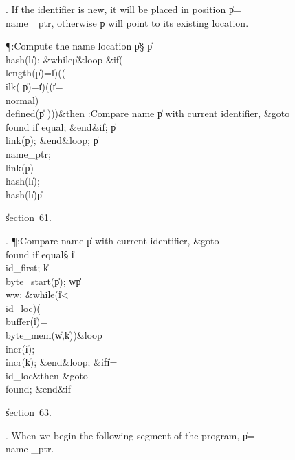 . If the identifier is new, it will be placed in position \|p\?=\?\\{name%
\_ptr},
otherwise \|p will point to its existing location.

\Y\P\?\4:Compute the name location \|p\X\S\?\6
\|p\?\K\?\\{hash}\?\1(\?\|h\?\2)\?;\6
\1\&{while}\8\|p\?\I{}\8\&{loop}\6
\&{if}\1\1\?\8\1(\?\\{length}\?\1(\?\|p\?\2)=\?\|l\?\2)\W\1(\1(\?\\{ilk}\?\1(\?%
\|p\?\2)=\?\|t\?\2)\V\1(\1(\?\|t\?=\?\\{normal}\?\2)\W\?\\{defined}\?\1(\?\|p\?%
\2)\2)\2)\?\2\8\&{then}\6
:Compare name \|p with current identifier, \&{goto}\8\\{found} if equal\X;%
\2\6
\&{end}\8\2\&{if}\1;\6
\|p\?\K\?\\{link}\?\1(\?\|p\?\2)\?;\2\6
\&{end}\8\&{loop};\6
\|p\?\K\?\\{name\_ptr};\6
\\{link}\?\1(\?\|p\?\2)\K\?\\{hash}\?\1(\?\|h\?\2)\?;\5
\\{hash}\?\1(\?\|h\?\2)\K\?\|p\par
\U section~61.\fi

. \P\?:Compare name \|p with current identifier, \&{goto}\8\\{found} if
equal\X\S\?\6
\|i\?\K\?\\{id\_first};\5
\|k\?\K\?\\{byte\_start}\?\1(\?\|p\?\2)\?;\5
\|w\?\K\?\|p\?\?\\{ww};\6
\1\&{while}\?\8\1(\?\|i\?<\?\\{id\_loc}\?\2)\W\1(\?\\{buffer}\?\1(\?\|i\?\2)=\?%
\\{byte\_mem}\?\1(\?\|w\?,\?\|k\?\2)\2)\?\8\&{loop}\6
\\{incr}\?\1(\?\|i\?\2)\?;\5
\\{incr}\?\1(\?\|k\?\2)\?;\2\6
\&{end}\8\&{loop};\6
\&{if}\1\1\8\|i\?=\?\\{id\_loc}\2\8\&{then}\6
\&{goto}\8\\{found};\2\6
\&{end}\8\2\&{if}\1\par
\U section~63.\fi

. When we begin the following segment of the program, \|p\?=\?\\{name%
\_ptr}.

